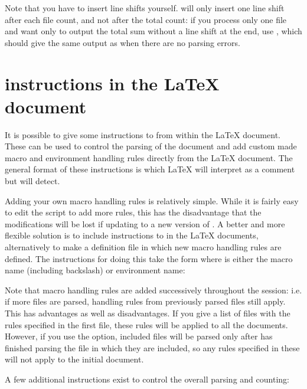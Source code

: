 \documentclass{article}
\begin{document}
Note that you have to insert line shifts yourself. \TeXcount{} will only insert one line shift after each file count, and not after the total count: if you process only one file and want only to output the total sum without a line shift at the end, use , which should give the same output as  when there are no parsing errors.




\section{\TeXcount{} instructions in the \LaTeX{} document}

It is possible to give some instructions to \TeXcount{} from within the
\LaTeX{} document. These can be used to control the parsing of the document and add custom made macro and environment handling rules directly from the \LaTeX{} document. The general format of these instructions is
which \LaTeX{} will interpret as a comment but \TeXcount{} will detect.

Adding your own macro handling rules is relatively simple. While it is fairly easy to edit the script to add more rules, this has the disadvantage that the modifications will be lost if updating to a new version of \TeXcount. A better and more flexible solution is to include instructions to \TeXcount{} in the \LaTeX{} documents, alternatively to make a definition file in which new macro handling rules are defined. The \TeXcount{} instructions for doing this take the form
where  is either the macro name (including backslash) or environment name:
%


Note that macro handling rules are added successively throughout the session: i.e. if more files are parsed, handling rules from previously parsed files still apply. This has advantages as well as disadvantages. If you give a list of files with the rules specified in the first file, these rules will be applied to all the documents. However, if you use the  option, included files will be parsed only after \TeXcount{} has finished parsing the file in which they are included, so any rules specified in these will not apply to the initial document.

A few additional \TeXcount{} instructions exist to control the overall parsing and counting:
\end{document}
